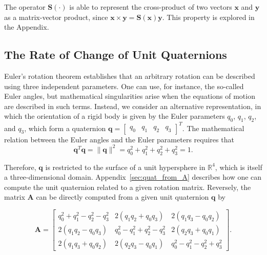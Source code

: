 \documentclass[aip,jcp,reprint,amsmath,amssymb]{revtex4-1}
\newcommand{\mt}[1]{\boldsymbol{\mathbf{#1}}}           %
\newcommand{\vt}[1]{\boldsymbol{\mathbf{#1}}}           %
\newcommand{\tr}[1]{#1^T}                               %
\begin{document}
The operator  $\mt S(\cdot)$ is able to represent the cross-product of two vectors $\vt x$ and $\vt y$ as a matrix-vector product, since $\vt x \times \vt y = \mt S(\vt x)\vt y$. This property is explored in the Appendix.

\subsection{The Rate of Change of Unit Quaternions}
\label{sec:eulerparameters}

Euler's rotation theorem establishes that an arbitrary rotation can be described using three independent parameters. One can use, for instance, the so-called Euler angles, but mathematical singularities arise when the equations of motion are described in such terms. Instead, we consider an alternative representation, in which the orientation of a rigid body is given by the Euler parameters $q_0$, $q_1$, $q_2$, and $q_3$, which form a quaternion $\vt q = \tr {[\begin{array}{cccc} q_0 & q_1 & q_2 & q_3 \end{array}]}$. The mathematical relation between the Euler angles and the Euler parameters requires that\cite{Goldstein2002}
\begin{equation}
\label{eq:norm_eq_1}
\tr{\vt q}{\vt q} = \|\vt q\|^2 = q_0^2 + q_1^2 + q_2^2 + q_3^2 = 1.
\end{equation}

Therefore, $\vt q$ is restricted to the surface of a unit hypersphere in $\mathbb{R}^4$, which is itself a three-dimensional domain. Appendix~\ref{sec:quat_from_A} describes how one can compute the unit quaternion related to a given rotation matrix. Reversely, the matrix $\mt A$ can be directly computed from a given unit quaternion $\vt q$ by\cite{Allen1989,Miller2002}
\begin{widetext}
\begin{equation}
\label{eq:A_from_q}
\mt A = \left[ \begin{array}{ccc}
q_0^2 + q_1^2 - q_2^2 - q_3^2 & 2(q_1 q_2 + q_0 q_3) & 2(q_1 q_3 - q_0 q_2) \\
2(q_1 q_2 - q_0 q_3) & q_0^2 - q_1^2 + q_2^2 - q_3^2 & 2(q_2 q_3 + q_0 q_1) \\
2(q_1 q_3 + q_0 q_2) & 2(q_2 q_3 - q_0 q_1) & q_0^2 - q_1^2 - q_2^2 + q_3^2  
\end{array} \right].
\end{equation}
\end{widetext}
\end{document}
